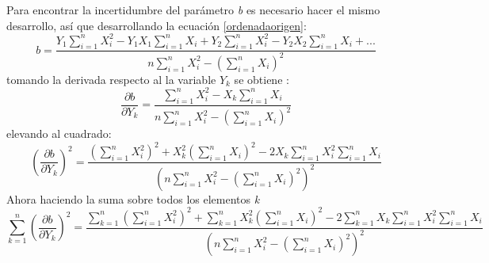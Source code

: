 \documentclass[12pt,letterpaper]{report}
\begin{document}
Para  encontrar la incertidumbre del parámetro \textit{b} es necesario hacer el mismo desarrollo, así que desarrollando la ecuación  \ref{ordenadaorigen}:
\begin{equation}
b=\dfrac{Y_{1}\displaystyle\sum_{i=1}^{n} X_{i}^{2} - Y_{1}X_{1} \displaystyle\sum_{i=1}^{n}X_{i} + 
Y_{2} \displaystyle\sum_{i=1}^{n} X_{i}^{2} - Y_{2}X_{2} \displaystyle\sum_{i=1}^{n}X_{i} + ... }{n \displaystyle\sum_{i=1}^{n} X_{i}^{2}- \left( \displaystyle\sum_{i=1}^{n} X_{i} \right) ^{2}}
\end{equation}
tomando la derivada respecto al la variable $ Y_{k} $ se obtiene :
\begin{equation}
\dfrac{\partial b}{\partial Y_{k}} =
\dfrac{\displaystyle\sum_{i=1}^{n} X_{i}^{2} - X_{k} \displaystyle\sum_{i=1}^{n} X_{i}}{n \displaystyle\sum_{i=1}^{n} X_{i}^{2}- \left( \displaystyle\sum_{i=1}^{n} X_{i} \right) ^{2}}
\end{equation}
elevando al cuadrado:
\begin{equation}
\left( \dfrac{\partial b}{\partial Y_{k}} \right) ^{2} =
\dfrac{  \left(  \displaystyle\sum_{i=1}^{n} X_{i}^{2}\right) ^{2} + 
X_{k}^{2}  \left(  \displaystyle\sum_{i=1}^{n} X_{i} \right) ^{2} -
2 X_{k} \displaystyle\sum_{i=1}^{n} X_{i}^{2} \displaystyle\sum_{i=1}^{n} X_{i}   }{\left( n \displaystyle\sum_{i=1}^{n} X_{i}^{2}- \left( \displaystyle\sum_{i=1}^{n} X_{i} \right) ^{2}     \right) ^{2} }
\end{equation}
Ahora haciendo la suma sobre todos los elementos \textit{k}
\begin{equation}
\displaystyle\sum_{k=1}^{n} \left( \dfrac{\partial b}{\partial Y_{k}} \right) ^{2} =
\dfrac{  \displaystyle\sum_{k=1}^{n} \left(   \displaystyle\sum_{i=1}^{n} X_{i}^{2}   \right) ^{2}  +
\displaystyle\sum_{k=1}^{n} X_{k}^{2}  \left( \displaystyle\sum_{i=1}^{n} X_{i} \right) ^{2} -
2 \displaystyle\sum_{k=1}^{n} X_{k} \displaystyle\sum_{i=1}^{n} X_{i}^{2}  \displaystyle\sum_{i=1}^{n} X_{i}  }{\left( n \displaystyle\sum_{i=1}^{n} X_{i}^{2}- \left( \displaystyle\sum_{i=1}^{n} X_{i} \right) ^{2}     \right) ^{2}}
\end{equation}
\end{document}
